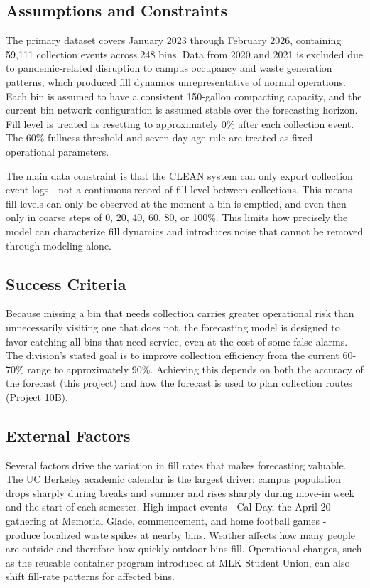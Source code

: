 \documentclass[11pt]{article}
\begin{document}
\subsection{Assumptions and Constraints}

The primary dataset covers January 2023 through February 2026, containing 59,111
collection events across 248 bins. Data from 2020 and 2021 is excluded due to
pandemic-related disruption to campus occupancy and waste generation patterns, which
produced fill dynamics unrepresentative of normal operations. Each bin is assumed to have
a consistent 150-gallon compacting capacity, and the current bin network configuration is
assumed stable over the forecasting horizon. Fill level is treated as resetting to
approximately 0\% after each collection event. The 60\% fullness threshold and seven-day
age rule are treated as fixed operational parameters.

The main data constraint is that the CLEAN system can only export collection event logs -
not a continuous record of fill level between collections. This means fill levels can only
be observed at the moment a bin is emptied, and even then only in coarse steps of 0, 20,
40, 60, 80, or 100\%. This limits how precisely the model can characterize fill dynamics
and introduces noise that cannot be removed through modeling alone.

\subsection{Success Criteria}

Because missing a bin that needs collection carries greater operational risk than
unnecessarily visiting one that does not, the forecasting model is designed to favor
catching all bins that need service, even at the cost of some false alarms. The division's
stated goal is to improve collection efficiency from the current 60-70\% range to
approximately 90\%. Achieving this depends on both the accuracy of the forecast (this
project) and how the forecast is used to plan collection routes (Project 10B).

\subsection{External Factors}

Several factors drive the variation in fill rates that makes forecasting valuable. The UC
Berkeley academic calendar is the largest driver: campus population drops sharply during
breaks and summer and rises sharply during move-in week and the start of each semester.
High-impact events - Cal Day, the April 20 gathering at Memorial Glade, commencement, and
home football games - produce localized waste spikes at nearby bins. Weather affects how
many people are outside and therefore how quickly outdoor bins fill. Operational changes,
such as the reusable container program introduced at MLK Student Union, can also shift
fill-rate patterns for affected bins.
\end{document}
